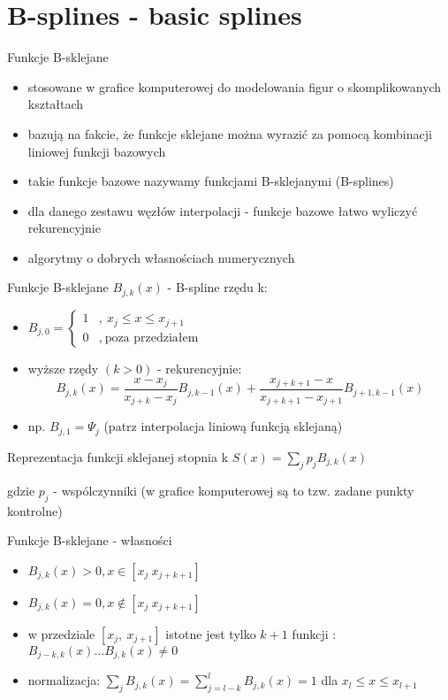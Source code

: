 \section{B-splines - basic splines}
\begin{frame}{Funkcje B-sklejane}
    \begin{itemize}
        \item stosowane w grafice komputerowej do modelowania figur o skomplikowanych kształtach
        \item bazują na fakcie, że funkcje sklejane można wyrazić za pomocą kombinacji liniowej funkcji bazowych 
        \item takie funkcje bazowe nazywamy funkcjami B-sklejanymi (B-splines)
        \item dla danego zestawu  węzłów interpolacji - funkcje bazowe łatwo wyliczyć rekurencyjnie 
        \item algorytmy o dobrych własnościach numerycznych
    \end{itemize}
\end{frame}
\begin{frame}{Funkcje B-sklejane}
	$B_{j,k}(x)$ - B-spline rzędu k:
    \begin{itemize}
    \item  $B_{j,0}=
        \begin{cases}
            	1  &,\ x_{j} \leq x \leq x_{j+1}
            	\\
                0 &,\ \textrm{poza przedziałem}
        \end{cases}
        $
        \item wyższe rzędy $(k>0)$ - rekurencyjnie:
        \[
        	B_{j,k}(x)=\frac{x-x_{j}}{x_{j+k}-x_{j}}B_{j,k-1}(x)+\frac{x_{j+k+1}-x}
            {x_{j+k+1}-x_{j+1}}B_{j+1,k-1}(x)
        \]
        \item np. $B_{j,1}=\Psi_j$ (patrz interpolacja liniową funkcją sklejaną)
    \end{itemize}
    \begin{exampleblock}{Reprezentacja funkcji sklejanej stopnia k}
		\centering $S(x)=\sum_{j}p_{j}B_{j,k}(x)$
	\end{exampleblock}
	 gdzie $p_j$ - wspólczynniki (w grafice komputerowej są to tzw. zadane punkty kontrolne) 
\end{frame}
\begin{frame}{Funkcje B-sklejane - własności}
     \begin{itemize}
        \item $B_{j,k}(x)>0, x\in[x_{j} \ x_{j+k+1}]$ 
        \item $B_{j,k}(x)=0, x\notin[x_{j} \ x_{j+k+1}]$ 
       
        \item w przedziale $[x_{j},\ x_{j+1}]$ istotne jest tylko $k+1$ funkcji : $B_{j-k,k}(x)\ldots  B_{j,k}(x)\neq 0$
		\item normalizacja: $\sum_{j}B_{j,k}(x)=\sum_{j=l-k}^{l}B_{j,k}(x)=1$ 
        \newline dla $x_{l}\leq x\leq x_{l+1}$
    \end{itemize}
\end{frame}
